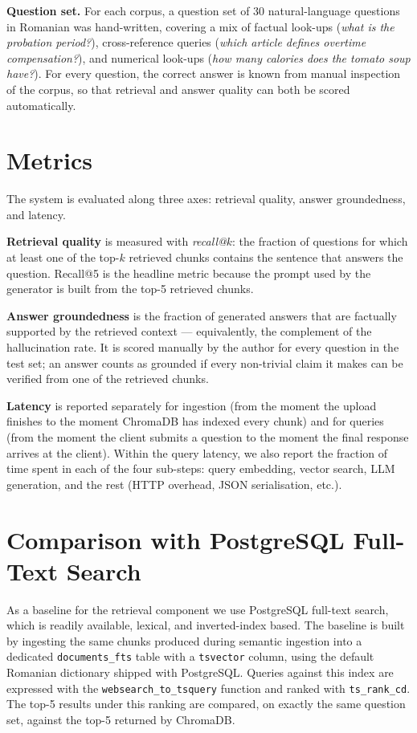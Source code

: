 \textbf{Question set.} For each corpus, a question set of 30
natural-language questions in Romanian was hand-written, covering a
mix of factual look-ups (\emph{what is the probation period?}),
cross-reference queries (\emph{which article defines overtime
compensation?}), and numerical look-ups (\emph{how many calories does
the tomato soup have?}). For every question, the correct answer is
known from manual inspection of the corpus, so that retrieval and
answer quality can both be scored automatically.

\section{Metrics}
\label{sec:metrics}

The system is evaluated along three axes: retrieval quality, answer
groundedness, and latency.

\textbf{Retrieval quality} is measured with \emph{recall@$k$}: the
fraction of questions for which at least one of the top-$k$ retrieved
chunks contains the sentence that answers the question. Recall@5 is
the headline metric because the prompt used by the generator is built
from the top-5 retrieved chunks.

\textbf{Answer groundedness} is the fraction of generated answers that
are factually supported by the retrieved context --- equivalently, the
complement of the hallucination rate. It is scored manually by the
author for every question in the test set; an answer counts as
grounded if every non-trivial claim it makes can be verified from one
of the retrieved chunks.

\textbf{Latency} is reported separately for ingestion (from the moment
the upload finishes to the moment ChromaDB has indexed every chunk)
and for queries (from the moment the client submits a question to the
moment the final response arrives at the client). Within the query
latency, we also report the fraction of time spent in each of the four
sub-steps: query embedding, vector search, LLM generation, and the
rest (HTTP overhead, JSON serialisation, etc.).

\section{Comparison with PostgreSQL Full-Text Search}
\label{sec:comparison}

As a baseline for the retrieval component we use PostgreSQL full-text
search, which is readily available, lexical, and inverted-index based.
The baseline is built by ingesting the same chunks produced during
semantic ingestion into a dedicated \texttt{documents\_fts} table with
a \texttt{tsvector} column, using the default Romanian dictionary
shipped with PostgreSQL. Queries against this index are expressed with
the \texttt{websearch\_to\_tsquery} function and ranked with
\texttt{ts\_rank\_cd}. The top-5 results under this ranking are
compared, on exactly the same question set, against the top-5 returned
by ChromaDB.

